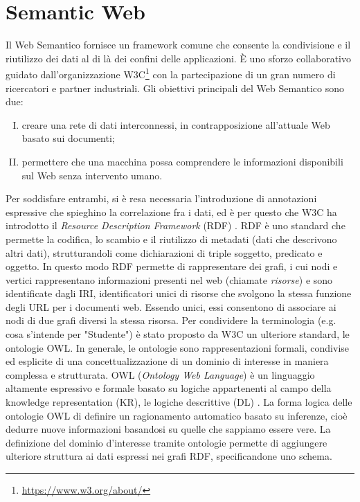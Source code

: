 \section{Semantic Web}
Il Web Semantico fornisce un framework comune che consente la condivisione e il riutilizzo dei dati al di là dei confini delle applicazioni.
 È uno sforzo collaborativo guidato dall'organizzazione W3C\footnote{\url{https://www.w3.org/about/}} con la partecipazione di un gran numero di ricercatori 
 e partner industriali. Gli obiettivi principali del Web Semantico \cite{berners2001semantic, hitzler2021review} sono due:
\begin{enumerate}[I)]
	\item creare una rete di dati interconnessi, in contrapposizione all'attuale Web basato sui documenti;
	\item permettere che una macchina possa comprendere le informazioni disponibili sul Web senza intervento umano.
\end{enumerate}
Per soddisfare entrambi, si è resa necessaria l'introduzione di annotazioni espressive che spieghino la correlazione fra i dati, ed è per questo che W3C ha 
introdotto il \textit{Resource Description Framework} (RDF) \cite{RDFspecification}. RDF è uno standard che permette la codifica, lo scambio e il riutilizzo 
di metadati (dati che descrivono altri dati), strutturandoli come dichiarazioni di triple soggetto, predicato e oggetto. In questo modo RDF permette di 
rappresentare dei grafi, i cui nodi e vertici rappresentano informazioni presenti nel web (chiamate \textit{risorse}) e sono identificate dagli IRI, 
identificatori unici di risorse che svolgono la stessa funzione degli URL per i documenti web. Essendo unici, essi consentono di associare ai nodi di due 
grafi diversi la stessa risorsa. Per condividere la terminologia (e.g. cosa s'intende per "Studente") è stato proposto da W3C un ulteriore standard, le 
ontologie OWL. In generale, le ontologie sono rappresentazioni formali, condivise ed esplicite di una concettualizzazione di un dominio di interesse 
\cite{goy2015ontologies} in maniera complessa e strutturata. OWL (\textit{Ontology Web Language}) è un linguaggio altamente espressivo e formale basato su 
logiche appartenenti al campo della knowledge representation (KR), le logiche descrittive (DL) \cite{baader2017introductionDL}. La forma logica delle 
ontologie OWL di definire un ragionamento automatico basato su inferenze, cioè dedurre nuove informazioni basandosi su quelle che sappiamo essere vere.
La definizione del dominio d'interesse tramite ontologie permette di aggiungere ulteriore struttura ai dati espressi nei grafi RDF, specificandone uno schema. 
